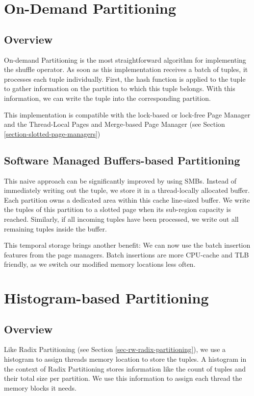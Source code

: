 \section{On-Demand Partitioning} \label{section-On-Demand-Partitioning}
\subsection{Overview}
On-demand Partitioning is the most straightforward algorithm for implementing the shuffle operator.
As soon as this implementation receives a batch of tuples, it processes each tuple individually.
First, the hash function is applied to the tuple to gather information on the partition to which this tuple belongs.
With this information, we can write the tuple into the corresponding partition.

This implementation is compatible with the lock-based or lock-free Page Manager and the Thread-Local Pages and Merge-based Page Manager (see Section \ref{section-slotted-page-managers})

\subsection{Software Managed Buffers-based Partitioning} This naive approach can be significantly improved by using \acfp{SMB}.
Instead of immediately writing out the tuple, we store it in a thread-locally allocated buffer.
Each partition owns a dedicated area within this cache line-sized buffer.
We write the tuples of this partition to a slotted page when its sub-region capacity is reached.
Similarly, if all incoming tuples have been processed, we write out all remaining tuples inside the buffer.

This temporal storage brings another benefit: We can now use the batch insertion features from the page managers.
Batch insertions are more \ac{CPU}-cache and \ac{TLB} friendly, as we switch our modified memory locations less often.

\section{Histogram-based Partitioning}\label{section-histogram-based-partitioning}
\subsection{Overview}
Like Radix Partitioning (see Section \ref{sec-rw-radix-partitioning}), we use a histogram to assign threads memory location to store the tuples.
A histogram in the context of Radix Partitioning stores information like the count of tuples and their total size per partition.
We use this information to assign each thread the memory blocks it needs.

